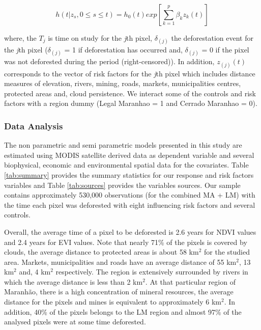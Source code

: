 \begin{center}
\begin{equation}
h(t|z_{s}, 0 \leq s \leq t) = h_{0}(t)exp[\sum^{p}_{k=1}\beta_{k}z_{k}(t)] \label{eq:8} 
\end{equation}
\end{center}

where, the $T_{j}$ is time on study for the \textit{j}th pixel, $\delta_{(j)}$ the deforestation event for the \textit{j}th pixel ($\delta_{(j)}$ = 1 if deforestation has occurred and, $\delta_{(j)}$ = 0 if the pixel was not deforested during the period (right-censored)). In addition, $z_{(j)}(t)$ corresponds to the vector of risk factors for the  \textit{j}th pixel which includes distance measures of elevation, rivers, mining, roads, markets, municipalities centres, protected areas and, cloud persistence. We interact some of the controls and risk factors with a region dummy (Legal Maranhao = 1 and Cerrado Maranhao = 0).


\subsubsection{Data Analysis}  %

The non parametric and semi parametric models presented in this study are estimated using MODIS satellite derived data as dependent variable and several biophysical, economic and environmental spatial data for the covariates. Table \ref{tab:summary} provides the summary statistics for our response and risk factors variables and Table \ref{tab:sources} provides the variables sources. Our sample contains approximately 530,000 observations (for the combined MA + LM) with the time each pixel was deforested with eight influencing risk factors and several controls.

Overall, the average time of a pixel to be deforested is 2.6 years for NDVI values and 2.4 years for EVI values. Note that nearly 71\% of the pixels is covered by clouds, the average distance to protected areas is about 58 km$^{2}$ for the studied area. Markets, municipalities and roads have an average distance of 55 km$^{2}$, 13 km$^{2}$ and, 4 km$^{2}$ respectively. The region is extensively surrounded by rivers in which the average distance is less than 2 km$^{2}$. At that particular region of Maranhão, there is a high concentration of mineral resources, the average distance for the pixels and mines is equivalent to approximately 6 km$^{2}$. In addition, 40\% of the pixels belongs to the LM region and almost 97\% of the analysed pixels were at some time deforested.

